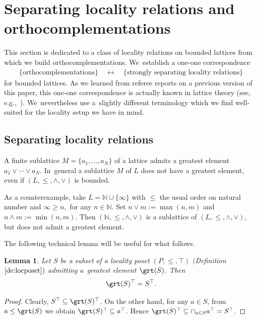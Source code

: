 \documentclass[pdftex]{sigma}
\numberwithin{equation}{section}
\newtheorem{Lemma}[Theorem]{Lemma}
\newcommand{\N}{\mathbb{N}}
\newcommand{\loc}{locality\xspace}
\newcommand{\pone}{separating\xspace }
\def \Pone {Separating\xspace }
\begin{document}
\section{\Pone \loc relations and orthocomplementations}
This section is dedicated to a class of \loc relations on bounded lattices from which we build orthocomplementations. We~establish a one-one correspondence
\begin{gather*}
\{\text{orthocomplementations}\} \quad \longleftrightarrow\quad \{\text{strongly \pone \loc relations}\}
\end{gather*}
for bounded lattices. As we learned from referee reports on a previous version of this paper, this one-one correspondence is actually known in lattice theory (see, e.g.,~\cite{CM}). We~nevertheless use a~slightly different terminology which we find well-suited for the locality setup we have in mind.

\subsection {\Pone \loc relations}

A finite sublattice $M=\{a_1,\dots,a_N\}$ of a lattice admits a greatest element $a_1\vee\cdots\vee a_N$. In~general a sublattice $M$ of $L$ does not have a greatest element, even if $(L,\leq,\wedge, \vee)$ is bounded.

\begin{coex} %
	As a
	counterexample, take $L=\N \cup \{\infty \}$
	with $\leq$ the usual order on natural number and $\infty \ge n,$ for any $n\in \N$.
	Set $n\vee m:=\max(n,m)$ and $n\wedge m:=\min(n,m)$. Then $(\N,\leq,\wedge, \vee)$ is a sublattice of $(L,\leq,\wedge, \vee)$, but does not admit
	a greatest element.
\end{coex}
The following technical lemma will be useful for what follows.
\begin{Lemma} \label{lem:maxtop}
	Let $S $ be a subset of a locality poset $(P,\leq,\top)$ $($Definition~$\ref{de:locposet})$ admitting a~greatest element $\grt(S)$. Then
	\begin{gather}\label{eq:maxtop}
	\grt (S)^\top= S^\top.
	\end{gather}
\end{Lemma}
\begin{proof}
Clearly, $S^\top \subseteq \grt (S)^\top$. On the other hand, for any $a\in S$, from $a\leq \grt (S)$ we obtain $\grt (S)^\top \subseteq a^\top$. Hence $\grt (S)^\top \subseteq \cap_{a\in S} a^\top =S^\top$.
\end{proof}
\end{document}
